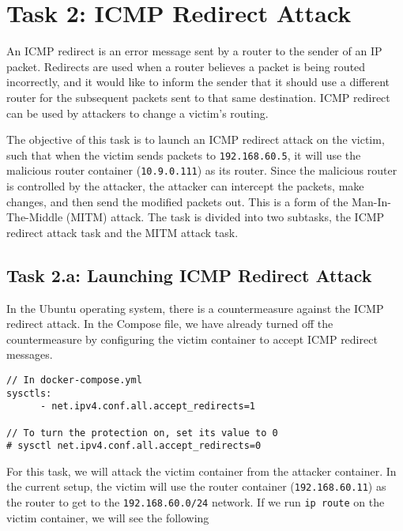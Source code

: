 \section{Task 2: ICMP Redirect Attack}

An ICMP redirect is an error message sent by a router to the sender of an
IP packet. Redirects are used when a router believes a packet is being
routed incorrectly, and it would like to inform the sender that it should
use a different router for the subsequent packets sent to that same
destination. ICMP redirect can be used by attackers to change 
a victim's routing. 


The objective of this task is to launch an ICMP redirect attack on the victim,
such that when the victim sends packets to \texttt{192.168.60.5},
it will use the malicious router container (\texttt{10.9.0.111})
as its router. 
Since the malicious router is controlled by the attacker, the attacker can 
intercept the packets, make changes, and then send 
the modified packets out. This is a form of the Man-In-The-Middle (MITM) attack. 
The task is divided into two subtasks, the ICMP redirect attack task and 
the MITM attack task.



\subsection{Task 2.a: Launching ICMP Redirect Attack} 

In the Ubuntu operating system, 
there is a countermeasure against the ICMP redirect attack. In the 
Compose file, we have already 
turned off the countermeasure by configuring the victim container
to accept ICMP redirect messages. 

\begin{lstlisting}
// In docker-compose.yml
sysctls:
      - net.ipv4.conf.all.accept_redirects=1

// To turn the protection on, set its value to 0
# sysctl net.ipv4.conf.all.accept_redirects=0
\end{lstlisting}


For this task, we will attack the victim container from 
the attacker container. In the current setup, 
the victim will use the router container (\texttt{192.168.60.11}) as
the router to get to the \texttt{192.168.60.0/24} network. If
we run \texttt{ip route} on the victim container, we will
see the following

